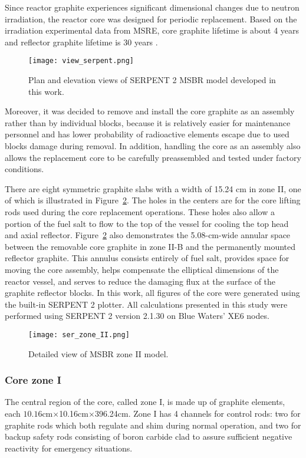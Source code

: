 Since reactor graphite experiences significant dimensional changes due to neutron irradiation, the reactor core was designed for periodic replacement. Based on the irradiation experimental data from \gls{MSRE}, core graphite lifetime is about 4 years and reflector graphite lifetime is 30 years \cite{robertson_conceptual_1971}.

\begin{figure}[hbp!] %
  \centering
  \texttt{[image: view\_serpent.png]}
  \caption{Plan and elevation views of SERPENT 2 \gls{MSBR} model developed in this work.}
  \label{fig:serpent_plan_view}
\end{figure}

Moreover, it was decided to remove and install the core graphite as an assembly rather than by individual blocks, because it is relatively easier for maintenance personnel and has lower probability of radioactive elements escape due to used blocks damage during removal. In addition, handling the core as an assembly also allows the replacement core to be carefully preassembled and tested under factory conditions.

There are eight symmetric graphite slabs with a width of 15.24 cm in zone II, one of which is illustrated in Figure~\ref{fig:serpent_zoneII}. The holes in the centers are for the core lifting rods used during the core replacement operations. These holes also allow a portion of the fuel salt to flow to the top of the vessel for cooling the top head and axial reflector. Figure~\ref{fig:serpent_zoneII} also demonstrates the 5.08-cm-wide annular space between the removable core graphite in zone II-B and the permanently mounted reflector graphite. This annulus consists entirely of fuel salt, provides space for moving the core assembly, helps compensate the elliptical dimensions of the reactor vessel, and serves to reduce the damaging flux at the surface of the graphite reflector blocks. In this work, all figures of the core were generated using the built-in SERPENT 2 plotter. All calculations presented in this study were performed using SERPENT 2 version 2.1.30 on Blue Waters’ XE6 nodes. 

\begin{figure}[t!] %
  \centering
  \texttt{[image: ser\_zone\_II.png]}
  \caption{Detailed view of \gls{MSBR} zone II model.}
  \label{fig:serpent_zoneII}
\end{figure}

\subsubsection{Core zone I}
The central region of the core, called zone I, is made up of graphite elements, each $10.16$cm$\times$10.16cm$\times$396.24cm. Zone I has 4 channels for control rods: two for graphite rods which both regulate and shim during normal operation, and two for backup safety rods consisting of boron carbide clad to assure sufficient negative reactivity for emergency situations.

